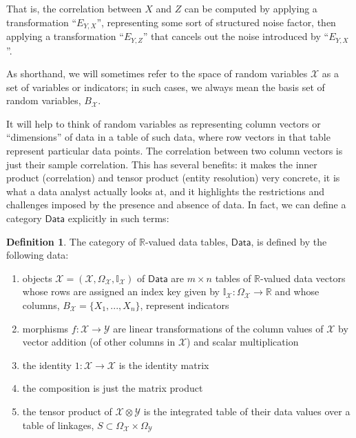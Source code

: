 \documentclass{article}
\theoremstyle{definition}
\newtheorem{definition}[theorem]{Definition}
\let\olddagger\dagger
\renewcommand{\dagger}{\ensuremath{\olddagger}\xspace}
\newcommand{\Cat}[1]{\mathsf{#1}}
\def\Data{\Cat{Data}}
\begin{document}
That is, the correlation between $X$ and $Z$ can be computed by applying a transformation ``$E_{Y,X}$'', representing some sort of structured noise factor, then applying a transformation ``$E_{Y,Z}$'' that cancels out the noise introduced by ``$E_{Y,X}$''. 

As shorthand, we will sometimes refer to the space of random variables $\mathcal{X}$ as a set of variables or indicators; in such cases, we always mean the basis set of random variables, $B_\mathcal{X}$.

It will help to think of random variables as representing column vectors or ``dimensions'' of data in a table of such data, where row vectors in that table represent particular data points. The correlation between two column vectors is just their sample correlation. This has several benefits: it makes the inner product (correlation) and tensor product (entity resolution) very concrete, it is what a data analyst actually looks at, and it highlights the restrictions and challenges imposed by the presence and absence of data. In fact, we can define a category $\Data$ explicitly in such terms:
\begin{definition}
The category of $\mathbb{R}$-valued data tables, $\Data$, is defined by the following data:
\begin{enumerate}
\item objects $\mathcal{X} = (\mathcal{X}, \Omega_\mathcal{X}, \mathbb{I}_\mathcal{X})$ of $\Data$ are $m \times n$ tables of $\mathbb{R}$-valued data vectors whose rows are assigned an index key given by $\mathbb{I}_\mathcal{X} : \Omega_\mathcal{X} \to \mathbb{R}$ and whose columns, $B_\mathcal{X} = \{X_1, ..., X_n\}$, represent indicators
\item morphisms $f: \mathcal{X} \to \mathcal{Y}$ are linear transformations of the column values of $\mathcal{X}$ by vector addition (of other columns in $\mathcal{X}$) and scalar multiplication
\item the identity $1 : \mathcal{X} \to \mathcal{X}$ is the identity matrix
\item the composition is just the matrix product
\item the tensor product of $\mathcal{X} \otimes \mathcal{Y}$ is the integrated table of their data values over a table of linkages, $S \subset \Omega_\mathcal{X} \times \Omega_\mathcal{Y}$
\end{enumerate}
\end{definition}
\end{document}
